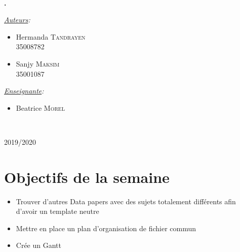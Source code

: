 \documentclass[11pt,oneside]{article}
\begin{document}
\begin{titlepage}
\phantom{aaaaaaaaaaaaaaaaaaaaaaaaaaaaaaaaaaaaaaa
ytrfdytfugvghikuhjbiujbhaaaaaaaaaaaaaaa}
\center
\fbox{\begin{minipage}[t][1cm][c]{8cm}
\begin{center}
{\huge \bfseries \textcolor{Rapport}{Feuille de Route}}
\end{center}
\end{minipage}}\\[0.5cm]
\textbf{\Large \color{Mulberry} .}\\[0.5cm] 
\begin{minipage}{0.5\textwidth}
\begin{flushleft} \large
\hspace{0.22\textwidth}\emph{\underline{Auteurs}:}\\
\begin{multicols}{2}
\begin{itemize}[font=\color{airforceblue} \Large, label=, leftmargin=0cm]
\item{Hermanda \textsc{Tandrayen} \\ {\small{35008782}}}
\item{Sanjy \textsc{Maksim} \\ {\small{35001087}}}
\end{itemize}
\end{multicols}
\end{flushleft}
\end{minipage}
\begin{minipage}{0.45\textwidth}
\begin{flushright} \large
\emph{\underline{Enseignante}:}\phantom{aaaaa}\\
\begin{itemize}[font=\color{amber} \Large, label=, leftmargin=3.5cm]
\item{Beatrice \textsc{Morel}}
\end{itemize}
\end{flushright}
\end{minipage}\\[0cm]
\vspace{10cm} 
\begin{center}
2019/2020
\end{center}
\vfill
\end{titlepage}


\newpage
\part*{Objectifs de la semaine}
\begin{itemize}
	\item Trouver d'autres Data papers avec des sujets totalement différents afin d'avoir un template neutre
	\item Mettre en place un plan d'organisation de fichier commun
	\item Crée un Gantt
\end{itemize}
\end{document}
